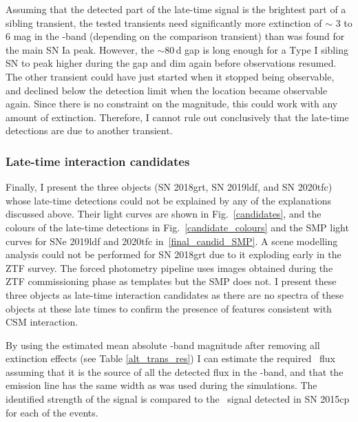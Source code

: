 \documentclass[a4paper,oneside,12pt, class=Latex/Classes/PhDthesisPSnPDF, crop=false]{standalone}
\begin{document}
Assuming that the detected part of the late-time signal is the brightest part of a sibling transient, the tested transients need significantly more extinction of $\sim$ 3 to 6 mag in the \ztfr-band (depending on the comparison transient) than was found for the main SN Ia peak. However, the $\sim 80$\,d gap is long enough for a Type I sibling SN to peak higher during the gap and dim again before observations resumed. The other transient could have just started when it stopped being observable, and declined below the detection limit when the location became observable again. Since there is no constraint on the magnitude, this could work with any amount of extinction. Therefore, I cannot rule out conclusively that the late-time detections are due to another transient.


\subsubsection{Late-time interaction candidates}
\label{sec:late_time_cand}
Finally, I present the three objects (SN 2018grt, SN 2019ldf, and SN 2020tfc) whose late-time detections could not be explained by any of the explanations discussed above. Their light curves are shown in Fig.~\ref{candidates}, and the colours of the late-time detections in Fig.~\ref{candidate_colours} and the SMP light curves for SNe 2019ldf and 2020tfc in~\ref{final_candid_SMP}. A scene modelling analysis could not be performed for SN 2018grt due to it exploding early in the ZTF survey. The forced photometry pipeline uses images obtained during the ZTF commissioning phase as templates but the SMP does not. I present these three objects as late-time interaction candidates as there are no spectra of these objects at these late times to confirm the presence of features consistent with CSM interaction.

By using the estimated mean absolute \ztfr-band magnitude after removing all extinction effects (see Table \ref{alt_trans_res}) I can estimate the required \Halpha~flux assuming that it is the source of all the detected flux in the \ztfr-band, and that the emission line has the same width as was used during the simulations. The identified strength of the signal is compared to the \Halpha~signal detected in SN 2015cp for each of the events.\\
\end{document}
